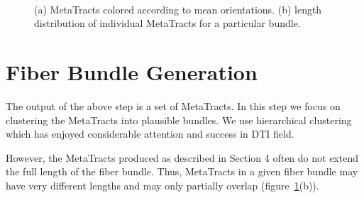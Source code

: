 \begin{figure}[h]
\centering
	\\
	\caption{(a) MetaTracts colored according to mean orientations. (b) length distribution of individual MetaTracts for a particular bundle.}
	\label{fig:length_distribution}
\end{figure}

\section {Fiber Bundle Generation}
\label{subsec:fiber-bundles}
The output of the above step is a set of MetaTracts. In this step we focus on clustering the MetaTracts into plausible bundles. We use hierarchical clustering which has enjoyed considerable attention and success in DTI field. 

However, the MetaTracts produced as described in Section 4 often do not extend the full length of the fiber bundle.  Thus, MetaTracts
in a given fiber bundle may have very different lengths and may only partially overlap (figure~\ref{fig:length_distribution}(b)).


